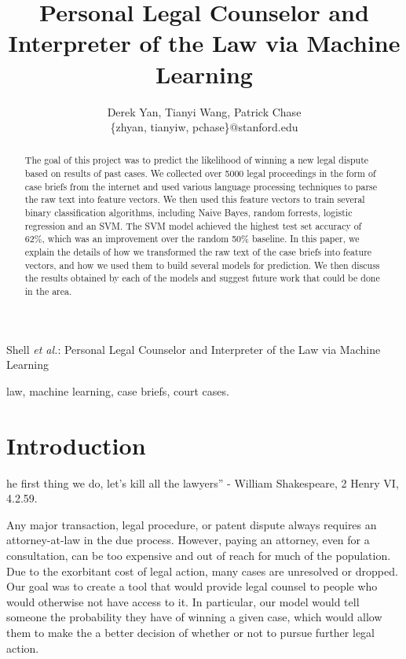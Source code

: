 \documentclass[journal]{IEEEtran}
\begin{document}
\title{Personal Legal Counselor and Interpreter of the Law via Machine Learning}
\author{Derek Yan, Tianyi Wang, Patrick Chase\\
\{zhyan, tianyiw, pchase\}@stanford.edu}
{Shell \MakeLowercase{\textit{et al.}}: Personal Legal Counselor and Interpreter of the Law via Machine Learning}
\maketitle

\begin{abstract}
The goal of this project was to predict the likelihood of winning a new legal dispute based on results of past cases. We collected over 5000 legal proceedings in the form of case briefs from the internet and used various language processing techniques to parse the raw text into feature vectors. We then used this feature vectors to train several binary classification algorithms, including Naive Bayes, random forrests, logistic regression and an SVM. The SVM model achieved the highest test set accuracy of 62\%, which was an improvement over the random 50\% baseline. In this paper, we explain the details of how we transformed the raw text of the case briefs into feature vectors, and how we used them to build several models for prediction. We then discuss the results obtained by each of the models and suggest future work that could be done in the area.
\end{abstract}

\begin{keywords}
law, machine learning, case briefs, court cases.
\end{keywords}

\section{Introduction}
 he first thing we do, let's kill all the lawyers'' - William Shakespeare, 2 Henry VI, 4.2.59. 

Any major transaction, legal procedure, or patent dispute always requires an attorney-at-law in the due process. However, paying an attorney, even for a consultation, can be too expensive and out of reach for much of the population. Due to the exorbitant cost of legal action, many cases are unresolved or dropped. Our goal was to create a tool that would provide legal counsel to people who would otherwise not have access to it. In particular, our model would tell someone the probability they have of winning a given case, which would allow them to make the a better decision of whether or not to pursue further legal action. 
\end{document}
